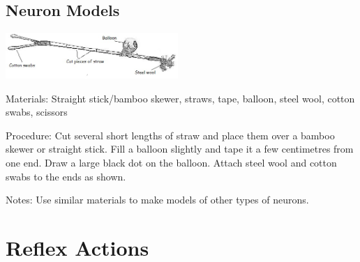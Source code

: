 \begin{multicols}{2}
\subsection{Neuron Models}

\begin{center}
\includegraphics[width=0.49\textwidth]{./img/neuron-model.jpg}
\end{center}

\begin{description*}
\item[Materials:]{Straight stick/bamboo skewer, straws, tape, balloon, steel wool, cotton swabs, scissors}
\item[Procedure:]{Cut several short lengths of straw and place them over a bamboo skewer or straight stick. Fill a balloon slightly and tape it a few centimetres from one end. Draw a large black dot on the balloon. Attach steel wool and cotton swabs to the ends as shown.}
\item[Notes:]{Use similar materials to make models of other types of neurons.}
\end{description*}


\section*{Reflex Actions}



\end{multicols}
